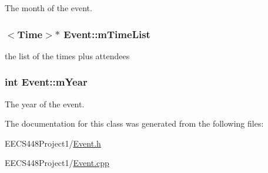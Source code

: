 The month of the event. 

\subsubsection[{\texorpdfstring{m\+Time\+List}{mTimeList}}]{$<${\bf Time}$>$$\ast$ Event\+::m\+Time\+List\hspace{0.3cm}{\ttfamily [private]}}\hypertarget{classEvent_ab5e1ade6acf4c99f4cd1662484bf2e6f}{}\label{classEvent_ab5e1ade6acf4c99f4cd1662484bf2e6f}


the list of the times plus attendees 

\subsubsection[{\texorpdfstring{m\+Year}{mYear}}]{\setlength{\rightskip}{0pt plus 5cm}int Event\+::m\+Year\hspace{0.3cm}{\ttfamily [private]}}\hypertarget{classEvent_ad633cc2ef4fb390c4fb59e835d46e09e}{}\label{classEvent_ad633cc2ef4fb390c4fb59e835d46e09e}


The year of the event. 



The documentation for this class was generated from the following files\+:\begin{DoxyCompactItemize}
\item 
E\+E\+C\+S448\+Project1/\hyperlink{Event_8h}{Event.\+h}\item 
E\+E\+C\+S448\+Project1/\hyperlink{Event_8cpp}{Event.\+cpp}\end{DoxyCompactItemize}
